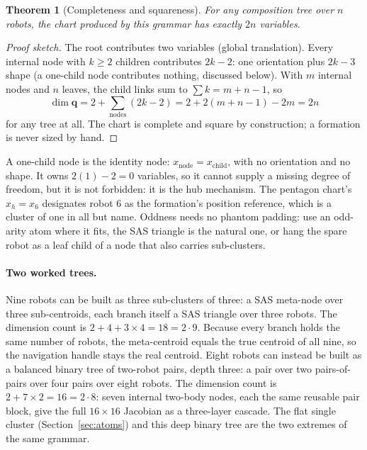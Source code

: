 \documentclass[12pt, letterpaper, oneside]{report}
\newtheorem{theorem}{Theorem}[chapter]
\begin{document}
\begin{theorem}[Completeness and squareness]
\label{thm:dim}
For any composition tree over $n$ robots, the chart produced by this
grammar has exactly $2n$ variables.
\end{theorem}
\begin{proof}[Proof sketch]
The root contributes two variables (global translation). Every internal
node with $k\geq2$ children contributes $2k-2$: one orientation plus
$2k-3$ shape (a one-child node contributes nothing, discussed below). With
$m$ internal nodes and $n$ leaves, the child links sum to $\sum k=m+n-1$, so
\begin{equation}
\dim\mathbf{q} = 2 + \sum_{\text{nodes}}(2k-2) = 2 + 2(m+n-1)-2m = 2n
\end{equation}
for any tree at all. The chart is complete and square by construction; a
formation is never sized by hand.
\end{proof}

A one-child node is the identity node: $x_{\text{node}}=x_{\text{child}}$,
with no orientation and no shape. It owns $2(1)-2=0$ variables, so it cannot
supply a missing degree of freedom, but it is not forbidden: it is the hub
mechanism. The pentagon chart's $x_h=x_6$ designates robot 6 as the
formation's position reference, which is a cluster of one in all but name.
Oddness needs no phantom padding: use an odd-arity atom where it fits, the
SAS triangle is the natural one, or hang the spare robot as a leaf child of
a node that also carries sub-clusters.

\paragraph{Two worked trees.} Nine robots can be built as three
sub-clusters of three: a SAS meta-node over three sub-centroids, each
branch itself a SAS triangle over three robots. The dimension count is
$2+4+3\times4=18=2\cdot9$. Because every branch holds the same number of
robots, the meta-centroid equals the true centroid of all nine, so the
navigation handle stays the real centroid. Eight robots can instead be
built as a balanced binary tree of two-robot pairs, depth three: a pair over
two pairs-of-pairs over four pairs over eight robots. The dimension count is
$2+7\times2=16=2\cdot8$: seven internal two-body nodes, each the same
reusable pair block, give the full $16\times16$ Jacobian as a three-layer
cascade. The flat single cluster (Section~\ref{sec:atoms}) and this deep
binary tree are the two extremes of the same grammar.
\end{document}
